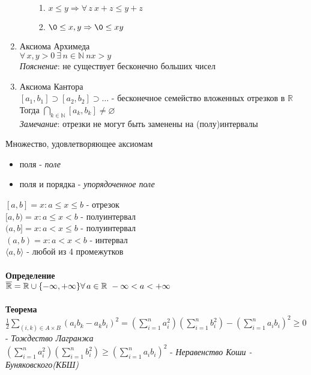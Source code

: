 \documentclass[12pt]{article}
\begin{document}
\begin{enumerate}
\begin{enumerate}
\begin{enumerate}
            \item $x\leq y \Rightarrow \forall\,z\ x+z \leq y+z$
            \item $\0\leq x, y \Rightarrow \0\leq xy$
        \end{enumerate}
    \end{enumerate}
    \item Аксиома Архимеда\\
    $\forall\,x,y>0\ \exists\,n\in \mathbb{N}\ nx>y$\\
    \textit{Пояснение}: не существует бесконечно больших чисел
    \item Аксиома Кантора\\
    $[a_1,b_1] \supset [a_2,b_2] \supset \ldots$ - бесконечное семейство вложенных отрезков в $\mathbb{R}$\\
    Тогда $\bigcap_{k\in\mathbb{N}}[a_k,b_k] \neq \varnothing$\\
    \textit{Замечание}: отрезки не могут быть заменены на (полу)интервалы\\

\end{enumerate}
Множество, удовлетворяющее аксиомам
\begin{itemize}
    \item поля - \textit{поле}
    \item поля и порядка - \textit{упорядоченное поле}
\end{itemize}
$[a,b] = {x: a\leq x\leq b}$ - отрезок\\
$[a,b) = {x: a\leq x< b}$ - полуинтервал\\
$(a,b] = {x: a < x \leq b}$ - полуинтервал\\
$(a,b) = {x: a < x < b}$ - интервал\\
$\langle a,b\rangle$ - любой из 4 промежутков\\\\
\textbf{Определение}\\
$\overline{\mathbb{R}} = \mathbb{R} \cup \{-\infty,+\infty\}\\
\forall\,a\in \mathbb{R}\ -\infty<a<+\infty$\\\\
\textbf{Теорема}\\
$\frac12\sum_{(i,k) \in A\times B} (a_ib_k-a_kb_i)^2 = (\sum_{i=1}^n a_i^2)(\sum_{i=1}^n b_i^2)-(\sum_{i=1}^n a_ib_i)^2 \geq 0$ - \textit{Тождество Лагранжа}\\
$(\sum_{i=1}^n a_i^2)(\sum_{i=1}^n b_i^2)\geq(\sum_{i=1}^n a_ib_i)^2$ - \textit{Неравенство Коши - Буняковского(КБШ)}
\end{document}
